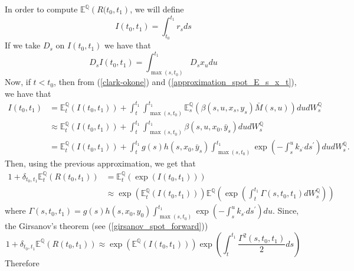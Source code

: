 \documentclass[a4paper,10pt]{article}
\newcommand{\1}{\mathbf{1}}
\begin{document}
In order to compute $\mathbb{E}^{\mathbb{Q}}\left(R(t_0,t_1\right)$, we will define
\begin{equation*}
I(t_0,t_1) = \int_{t_0}^{t_1} r_s ds
\end{equation*}
If we take $D_s$ on $I(t_0,t_1)$ we have that
\begin{equation*}
D_sI(t_0,t_1) = \int_{\max(s, t_{0})}^{t_1}  D_s x_u du 
\end{equation*}
Now, if $t < t_0$, then from (\ref{clark-okone}) and (\ref{approximation_spot_E_s_x_t}), we have that 
\begin{align}\label{apprx_I_t0_t1}
I(t_0,t_1) &= \mathbb{E}_t^{\mathbb{Q}}\left(I(t_0,t_1)\right) + \int_{t}^{t_1}\int_{\max(s, t_{0})}^{t_1}  \mathbb{E}_s^{\mathbb{Q}}\left(\beta(s,u,x_s,y_s) \bar{M}(s,u) \right) du dW_s^{\mathbb{Q}} \nonumber \\
&\approx \mathbb{E}_t^{\mathbb{Q}}\left(I(t_0,t_1)\right) + \int_{t}^{t_1}\int_{\max(s, t_{0})}^{t_1} \beta(s,u,x_0,\bar{y}_s) du dW_s^{\mathbb{Q}}\nonumber \\
&= \mathbb{E}_t^{\mathbb{Q}}\left(I(t_0,t_1)\right) + \int_{t}^{t_1} g(s)h(s,x_0,\bar{y}_s)\int_{\max(s, t_{0})}^{t_1} \exp\left( -\int_{s}^{u} k_{s^{\prime}} ds^{\prime}\right) du dW_s^{\mathbb{Q}}.
\end{align}
Then, using the previous approximation, we get that
\begin{align*}
1 + \delta_{t_0,t_1}\mathbb{E}_t^{\mathbb{Q}}\left(R(t_0,t_1)\right) &= \mathbb{E}_t^{\mathbb{Q}}\left( \exp(I(t_0,t_1)) \right)\\
&\approx \exp\left(\mathbb{E}_t^{\mathbb{Q}}\left(I(t_0,t_1)\right)\right)  \mathbb{E}^{\mathbb{Q}}\left(\exp\left(\int_{t}^{t_1} \Gamma(s,t_0,t_1)dW_s^{\mathbb{Q}}\right)\right)
\end{align*}
where $\Gamma(s,t_0,t_1)= g(s)h(s,x_0,y_0)\int_{\max(s, t_{0})}^{t_1} \exp\left( -\int_{s}^{u} k_{s^{\prime}} ds^{\prime}\right)du$. 
Since, the Girsanov's theorem (see (\ref{girsanov_spot_forward}))
\begin{equation}\label{representation_i_0_t}
1 + \delta_{t_0,t_1}\mathbb{E}^{\mathbb{Q}}\left(R(t_0,t_1)\right) \approx \exp\left(\mathbb{E}^{\mathbb{Q}}\left(I(t_0,t_1)\right)\right)\exp\left(\int_{t}^{t_1}\frac{ \Gamma^{2}(s,t_0,t_1)}{2} ds\right)
\end{equation}
Therefore
\end{document}
